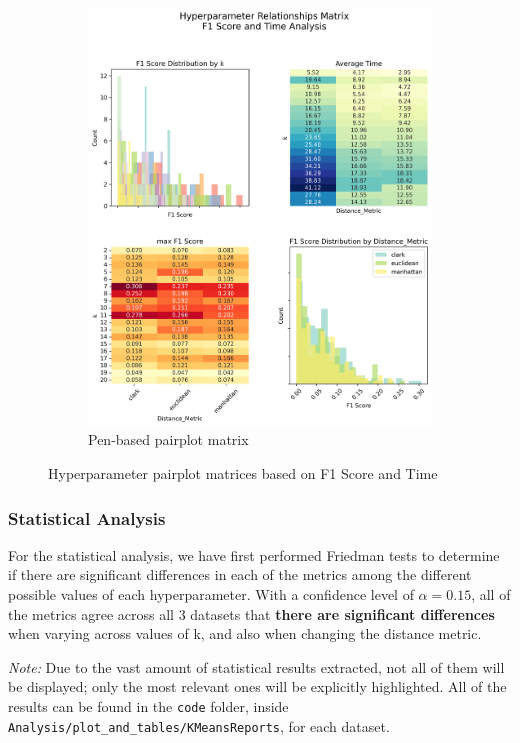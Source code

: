 \begin{figure}[H]
\begin{subfigure}{0.49\textwidth}
        \includegraphics[width=\linewidth]{figures/penbased_hyperparameter_pairplot_matrix.png}
        \caption{Pen-based pairplot matrix}
    \end{subfigure}
    \caption{Hyperparameter pairplot matrices based on F1 Score and Time}
    \label{fig:pairplot}
\end{figure}

\subsubsection{Statistical Analysis}
For the statistical analysis, we have first performed Friedman tests to determine if there are significant differences in each of the metrics among the different possible values of each hyperparameter. With a confidence level of $\alpha = 0.15$, all of the metrics agree across all 3 datasets that \textbf{there are significant differences} when varying across values of k, and also when changing the distance metric. 

\textit{Note:} Due to the vast amount of statistical results extracted, not all of them will be displayed; only the most relevant ones will be explicitly highlighted. All of the results can be found in the \texttt{code} folder, inside \texttt{Analysis/plot\_and\_tables/KMeansReports}, for each dataset.

